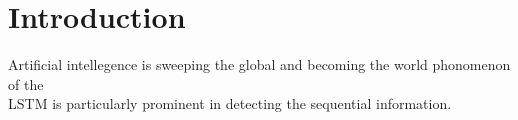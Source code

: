 \section{Introduction}
Artificial intellegence is sweeping the global and becoming the world phonomenon of the 
\\
LSTM is particularly prominent in detecting the sequential information. 